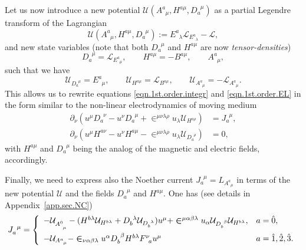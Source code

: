 \documentclass[
10pt, %
a4paper, %
oneside, %
headinclude,footinclude, %
BCOR5mm, %
]{scrartcl}
\newcommand{\itetr}[2]{F^{#1}_{\phantom{#1}#2}}
\newcommand{\tetr}[2]{A^{#1}_{\phantom{#1}#2}}
\newcommand{\D}[1]{\partial_{#1}} %
\newcommand{\ET}[2]{E^{#1}_{\phantom{#1}#2}}	%
\newcommand{\eT}[2]{D_{#1}^{\phantom{#1}#2}}	%
\newcommand{\BT}[2]{B^{#1#2}}	%
\newcommand{\hT}[2]{H^{#1#2}}	%
\newcommand{\Laghodge}{L}%
\newcommand{\LagBE}{\mathcal{L}}%
\newcommand{\LagST}{\mathcal{U}}%
\newcommand{\LCsymb}{\bm{\in}}    %
\newcommand{\NC}[2]{J^{\phantom{#1}#2}_{#1}}
\newcommand{\indlat}[1]{\hat{\mathsmaller{#1}}}
\begin{document}
Let us now introduce a new potential $ \LagST(\tetr{a}{\mu},\hT{a}{\mu},\eT{a}{\mu}) $ as a partial 
Legendre transform of the Lagrangian
\begin{equation}\label{eqn.Legandre1}
 \LagST(\tetr{a}{\mu},\hT{a}{\mu},\eT{a}{\mu}) := \ET{a}{\lambda}\LagBE_{\ET{a}{\lambda}} - \LagBE,
\end{equation}
and new state variables (note that both $ \eT{a}{\mu} $ and $ \hT{a}{\mu} $ are now 
\emph{tensor-densities})
\begin{equation}\label{eqn.Legandre2}
\eT{a}{\mu} = \LagBE_{\ET{a}{\mu}}, \qquad \hT{a}{\mu} = -\BT{a}{\mu}, \qquad \tetr{a}{\mu},
\end{equation}
such that we have
\begin{equation}\label{eqn.Legandre3}
\LagST_{\eT{a}{\mu}} = \ET{a}{\mu}, \qquad \LagST_{\hT{a}{\mu}} = \LagBE_{\BT{a}{\mu}},
\qquad \LagST_{\tetr{a}{\mu}} = - \LagBE_{\tetr{a}{\mu}}.
\end{equation}
This allows us to rewrite equations \eqref{eqn.1st.order.integr} and \eqref{eqn.1st.order.EL} in 
the form similar to the non-linear 
electrodynamics of moving medium~\cite{Obukhov2008,DPRZ2017,Hohmann2018a}
\begin{subequations}
	\begin{align}
		\D{\nu}(u^\mu\eT{a}{\nu} - u^\nu \eT{a}{\mu} + 
		\LCsymb^{\mu\nu\lambda\rho}u_\lambda 
		\LagST_{\hT{a}{\rho}})
		& =	\NC{a}{\mu},\\[2mm]
		\D{\nu}(u^\mu \hT{a}{\nu} - u^\nu \hT{a}{\mu} - 
		\LCsymb^{\mu\nu\lambda\rho}u_\lambda 
		\LagST_{\eT{a}{\rho}}) 
		& = 0,
\end{align}
\end{subequations}
with $\hT{a}{\mu}$ and $\eT{a}{\mu}$ being the analog of the magnetic and electric fields, 
accordingly.


Finally, we need to express also the Noether current $ \NC{a}{\mu} = \Laghodge_{\tetr{a}{\mu}} $ in 
terms of the 
new potential $ \LagST $ and the fields $ \eT{a}{\mu} $ and $ \hT{a}{\mu} $. One has (see details 
in Appendix~\ref{app.sec.NC})
\begin{equation}\label{eqn.J}
	\NC{a}{\mu} = \left\{
	\begin{array}{ll}
	-\LagST_{\tetr{\indlat{0}}{\mu}} 
	- (\hT{b}{\lambda} \LagST_{\hT{b}{\lambda}} 
	+ \eT{b}{\lambda} \LagST_{\eT{b}{\lambda}} )u^\mu
	+ \LCsymb^{\mu\alpha\beta\lambda} u_\alpha 
	\LagST_{\eT{b}{\beta}} \LagST_{\hT{b}{\lambda}},	& a=\hat{0},  \\[3mm] 
	-\LagST_{\tetr{a}{\mu}}	
	- \LCsymb_{\nu\alpha\beta\lambda}u^\alpha\eT{b}{\beta}\hT{b}{\lambda}\itetr{\nu}{a}u^\mu & a = 
	\hat{1},\hat{2},\hat{3}. \\ 
	\end{array} 
	\right.
\end{equation}
\end{document}
